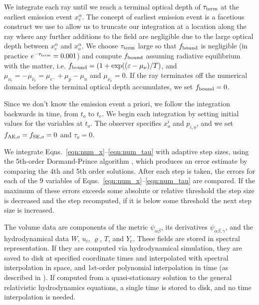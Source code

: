 \documentclass[aps,floatfix,prd,superscriptaddress,twocolumn]{revtex4-1}
\newcommand{\todo}[1]{\marginpar{\tiny{\textcolor{red}{#1}}}}
\begin{document}
We integrate each ray until we reach a terminal optical depth of
$\tau_{\rm term}$ at the earliest emission event $x_e^\alpha$.
The concept of earliest emission event is a facetious construct we use
to allow us to truncate our integration at a location along the ray where any
further additions to the field are negligible due to the large optical depth
between $x_e^\alpha$ and $x_o^\alpha$.
We choose $\tau_{\rm term}$ large so that
$f_{\rm bound}$ is negligible
(in practice $e^{-\tau_{\rm term}}=0.001$)
and compute $f_{\rm bound}$ assuming radiative equilibrium with the matter,
i.e. $f_{\rm bound}=(1+\exp((\varepsilon-\mu_\nu)/T)$,
and $\mu_{\nu_e}=-\mu_{\bar{\nu}_e}=\mu_{e^{-}}+\mu_p-\mu_n$ and
$\mu_{\nu_x}=0$.
If the ray terminates off the numerical domain before the terminal optical
depth accumulates, we set $f_{\rm bound}=0$.

Since we don't know the emission event a priori,
\todo{make clear ``emission event'' doesn't involve physical assumption}
we follow the integration backwards in time,
from $t_o$ to $t_e$.
We begin each integration by setting initial values for the variables at $t_o$.
The observer specifies $x^i_o$ and $p_{i,o}$,
and we set $f_{{\rm AE},o}=f_{{\rm SE},o}=0$ and $\tau_o=0$.

We integrate Eqns.~\ref{eqn:num_x}--\ref{eqn:num_tau} with adaptive step sizes,
using the 5th-order Dormand-Prince algorithm \cite{pres2007-nr_3rd_ed},
which produces an error estimate by comparing the 4th and 5th order solutions.
\todo{confirm}
After each step is taken, the errors for each of the 9 variables of
Eqns.~\ref{eqn:num_x}--\ref{eqn:num_tau} are compared.
If the maximum of these errors exceeds some absolute or relative threshold
\todo{specify ScaledAbsRel algorithm}
the step size is decreased and the step recomputed,
if it is below some threshold the next step size is increased.
\todo{specify}

The volume data are components of the metric $\psi_{\alpha\beta}$,
its derivatives $\psi_{\alpha\beta,\gamma}$,
and the hydrodynamical data $W$, $u_i$, $\varrho$, $T$, and $Y_e$.
These fields are stored in spectral representation.
If they are computed via hydrodynamical simulation, they are saved to disk
at specified coordinate times and interpolated
with spectral interpolation in space,
and 1st-order polynomial interpolation in time
(as described in \cite[App.~B]{bohn2016-code}).
If computed from a quasi-stationary solution to the
\todo{clarify quasistationary timescale}
general relativistic hydrodynamics equations,
a single time is stored to disk, and no time interpolation is needed.
\end{document}
